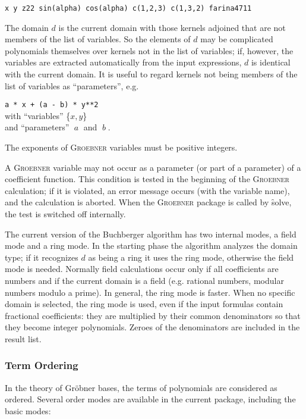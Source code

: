 \begin{verbatim}
x y z22 sin(alpha) cos(alpha) c(1,2,3) c(1,3,2) farina4711
\end{verbatim}

The domain $d$ is the current \REDUCE domain with those kernels
adjoined that are not members of the list of variables. So the
elements of $d$ may be complicated polynomials themselves over
kernels not in the list of variables; if, however, the variables are
extracted automatically from the input expressions, $d$ is identical
with the current \REDUCE domain. It is useful to regard kernels not
being members of the list of variables as ``parameters'', e.g.
\begin{center}
  \texttt{a * x + (a - b) * y**2} \\
  with ``variables'' \{$x,y$\} \\
  and ``parameters'' $\;a\;$ and $\;b\;$.
\end{center}

The exponents of \textsc{Groebner} variables must be positive integers.

A \textsc{Groebner} variable may not occur as a parameter (or part
of a parameter) of a coefficient function. This condition is
tested in the beginning of the \textsc{Groebner} calculation; if it is
violated, an error message occurs (with the variable name), and the
calculation is aborted. When the \textsc{Groebner} package is called by
\f{solve}, the test is switched off internally.

The current version of the Buchberger algorithm has two internal
modes, a field mode and a ring mode. In the starting phase the
algorithm analyzes the domain type; if it recognizes $d$ as being a
ring it uses the ring mode, otherwise the field mode is needed.
Normally field calculations occur only if all coefficients are numbers
and if the current \REDUCE domain is a field (e.g. rational numbers,
modular numbers modulo a prime). In general, the ring mode is faster.
When no specific
\REDUCE domain is selected, the ring mode is used, even if the input
formulas contain fractional coefficients: they are multiplied by their
common denominators so that they become integer polynomials. Zeroes of the
denominators are included in the result list.

\subsubsection{Term Ordering}
\par
In the theory of Gr\"obner bases, the terms of polynomials are
considered as ordered. Several order modes are available in
the current package, including the basic modes:

